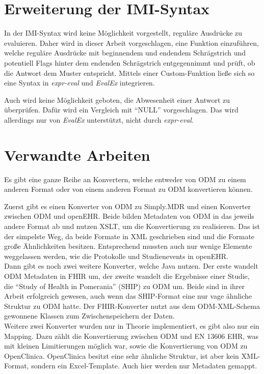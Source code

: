 \section{Erweiterung der IMI-Syntax}
\label{d:imi}

In der IMI-Syntax wird keine Möglichkeit vorgestellt, reguläre Ausdrücke zu evaluieren.
Daher wird in dieser Arbeit vorgeschlagen, eine Funktion
\noindent einzuführen, welche reguläre Ausdrücke mit beginnendem und endendem Schrägstrich und potentiell Flags hinter dem endenden Schrägstrich entgegennimmt und prüft, ob die Antwort dem Muster entspricht.
Mittels einer Custom-Funktion ließe sich so eine Syntax in \textit{expr-eval} und \textit{EvalEx} integrieren.

Auch wird keine Möglichkeit geboten, die Abwesenheit einer Antwort zu überprüfen. Dafür wird ein Vergleich mit \enquote{NULL} vorgeschlagen.
Das wird allerdings nur von \textit{EvalEx} unterstützt, nicht durch \textit{expr-eval}.

\section{Verwandte Arbeiten}

Es gibt eine ganze Reihe an Konvertern, welche entweder von ODM zu einem anderen Format oder von einem anderen Format zu ODM konvertieren können.

Zuerst gibt es einen Konverter von ODM zu Simply.MDR \cite{odm2mdr} und einen Konverter zwischen ODM und openEHR\cite{odm2openehr}.
Beide bilden Metadaten von ODM in das jeweils andere Format ab und nutzen XSLT, um die Konvertierung zu realisieren.
Das ist der simpelste Weg, da beide Formate in XML geschrieben sind und die Formate große Ähnlichkeiten besitzen.
Entsprechend mussten auch nur wenige Elemente weggelassen werden, wie die Protokolle und Studienevents in openEHR.\\

Dann gibt es noch zwei weitere Konverter, welche Java nutzen. Der erste wandelt ODM Metadaten in FHIR \cite{odm2fhir} um, der zweite wandelt die Ergebnisse einer Studie, die \enquote{Study of Health in Pomerania} (SHIP) zu ODM um\cite{ship2odm}.
Beide sind in ihrer Arbeit erfolgreich gewesen, auch wenn das SHIP-Format eine nur vage ähnliche Struktur zu ODM hatte.
Der FHIR-Konverter nutzt aus dem ODM-XML-Schema gewonnene Klassen zum Zwischenspeichern der Daten.\\

Weitere zwei Konverter wurden nur in Theorie implementiert, es gibt also nur ein Mapping.
Dazu zählt die Konvertierung zwischen ODM und EN 13606 EHR\cite{odm2ehr}, was mit kleinen Limitierungen möglich war, sowie die Konvertierung von ODM zu OpenClinica\cite{odm2oc}.
OpenClinica besitzt eine sehr ähnliche Struktur, ist aber kein XML-Format, sondern ein Excel-Template.
Auch hier werden nur Metadaten gemappt.\\


